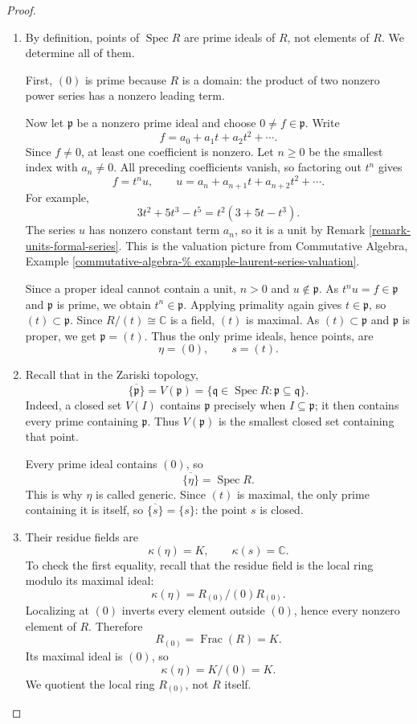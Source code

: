 \begin{proof}
\begin{enumerate}
\item By definition, points of
$\operatorname{Spec}R$ are prime ideals
of $R$, not elements of $R$.
We determine all of them.

First, $(0)$ is prime because $R$ is
a domain: the product of two nonzero
power series has a nonzero leading term.

Now let $\mathfrak{p}$ be a nonzero
prime ideal and choose
$0\neq f\in\mathfrak{p}$.
Write
$$
f=a_0+a_1t+a_2t^2+\cdots.
$$
Since $f\neq0$, at least one coefficient
is nonzero.
Let $n\geq0$ be the smallest index
with $a_n\neq0$.
All preceding coefficients vanish,
so factoring out $t^n$ gives
$$
f=t^n u,\qquad
u=a_n+a_{n+1}t+a_{n+2}t^2+\cdots.
$$
For example,
$$
3t^2+5t^3-t^5=t^2(3+5t-t^3).
$$
The series $u$ has nonzero constant
term $a_n$, so it is a unit by Remark
\ref{remark-units-formal-series}.
This is the valuation picture from
Commutative Algebra, Example
\ref{commutative-algebra-%
example-laurent-series-valuation}.

Since a proper ideal cannot contain
a unit, $n>0$ and $u\notin\mathfrak{p}$.
As $t^n u=f\in\mathfrak{p}$ and
$\mathfrak{p}$ is prime, we obtain
$t^n\in\mathfrak{p}$.
Applying primality again gives
$t\in\mathfrak{p}$, so
$(t)\subset\mathfrak{p}$.
Since $R/(t)\cong\mathbb{C}$ is a field,
$(t)$ is maximal.
As $(t)\subset\mathfrak{p}$ and
$\mathfrak{p}$ is proper, we get
$\mathfrak{p}=(t)$.
Thus the only prime ideals, hence points,
are
$$
\eta=(0),\qquad s=(t).
$$
\item Recall that in the Zariski topology,
$$
\overline{\{\mathfrak{p}\}}
=V(\mathfrak{p})
=\{\mathfrak{q}\in\operatorname{Spec}R:
\mathfrak{p}\subseteq\mathfrak{q}\}.
$$
Indeed, a closed set $V(I)$ contains
$\mathfrak{p}$ precisely when
$I\subseteq\mathfrak{p}$; it then
contains every prime containing
$\mathfrak{p}$. Thus $V(\mathfrak{p})$
is the smallest closed set containing
that point.

Every prime ideal contains $(0)$, so
$$
\overline{\{\eta\}}=\operatorname{Spec}R.
$$
This is why $\eta$ is called generic.
Since $(t)$ is maximal, the only prime
containing it is itself, so
$\overline{\{s\}}=\{s\}$:
the point $s$ is closed.
\item Their residue fields are
$$
\kappa(\eta)=K,\qquad
\kappa(s)=\mathbb{C}.
$$
To check the first equality, recall that
the residue field is the local ring
modulo its maximal ideal:
$$
\kappa(\eta)=R_{(0)}/(0)R_{(0)}.
$$
Localizing at $(0)$ inverts every
element outside $(0)$, hence every
nonzero element of $R$. Therefore
$$
R_{(0)}=\operatorname{Frac}(R)=K.
$$
Its maximal ideal is $(0)$, so
$$
\kappa(\eta)=K/(0)=K.
$$
We quotient the local ring $R_{(0)}$,
not $R$ itself.


\end{enumerate}
\end{proof}
